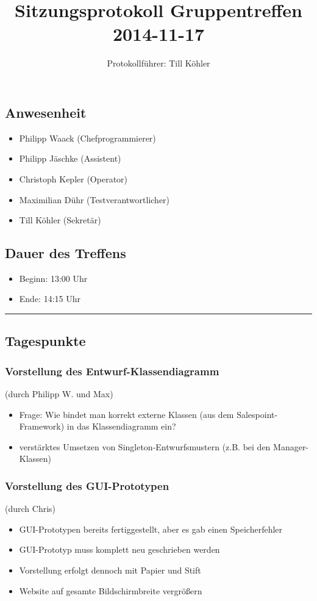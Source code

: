 \documentclass[12pt,a4paper]{article}
\author{Protokollführer: Till Köhler}
\title{Sitzungsprotokoll Gruppentreffen 2014-11-17}
\date{}
\begin{document}
\maketitle

\subsection*{Anwesenheit}
\medskip
\begin{itemize}
\item Philipp Waack (Chefprogrammierer)
\item Philipp Jäschke (Assistent)
\item Christoph Kepler (Operator)
\item Maximilian Dühr (Testverantwortlicher)
\item Till Köhler (Sekretär)
\end{itemize}

\subsection*{Dauer des Treffens}
\medskip
\begin{itemize}
\item Beginn: 13:00 Uhr
\item Ende: 14:15 Uhr
\end{itemize}

\noindent\rule{\textwidth}{1pt}

\subsection*{Tagespunkte}
\medskip

\subsubsection*{Vorstellung des Entwurf-Klassendiagramm}
(durch Philipp W. und Max)
\begin{itemize}
\item Frage: Wie bindet man korrekt externe Klassen (aus dem Salespoint-Framework) in das Klassendiagramm ein?
\item verstärktes Umsetzen von Singleton-Entwurfsmustern (z.B. bei den Manager-Klassen)
\end{itemize}

\subsubsection*{Vorstellung des GUI-Prototypen}
(durch Chris)
\begin{itemize}
\item GUI-Prototypen bereits fertiggestellt, aber es gab einen Speicherfehler
\item GUI-Prototyp muss komplett neu geschrieben werden
\item Vorstellung erfolgt dennoch mit Papier und Stift
\item Website auf gesamte Bildschirmbreite vergrößern
\end{itemize}
\end{document}

